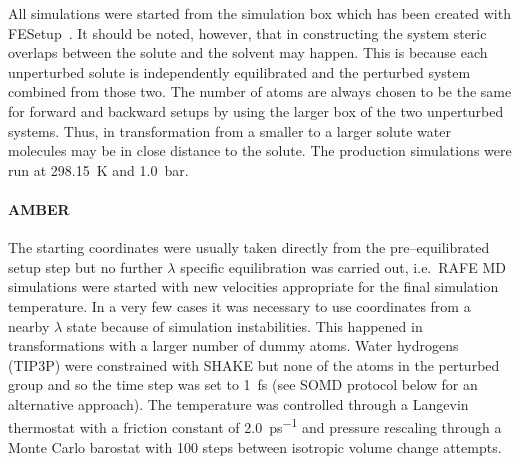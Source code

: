 \documentclass[journal=jctcce,manuscript=article]{achemso}
\begin{document}
All simulations were started from the simulation box which has been 
created with FESetup~\cite{loeffler_fesetup:_2015}.  It should be noted, 
however, that in constructing the system steric overlaps between the solute and 
the solvent may happen.  This is because each unperturbed solute is 
independently equilibrated and the perturbed system combined from those two.  
The number of atoms are always chosen to be the same for forward and backward 
setups by using the larger box of the two unperturbed systems.  Thus, in 
transformation from a smaller to a larger solute water molecules may be in 
close distance to the solute.  The production simulations were run at 
\SI{298.15}{K} and \SI{1.0}{bar}.

\paragraph{AMBER} The starting coordinates were usually taken directly from the
pre--equilibrated setup step but no further $\lambda$ specific equilibration 
was carried out, i.e.\ RAFE MD simulations were started with new velocities appropriate for the 
final simulation temperature.  In a very few cases it was necessary to use 
coordinates from a nearby $\lambda$ state because of simulation instabilities.  
This happened in transformations with a larger number of dummy atoms.  Water 
hydrogens (TIP3P) were constrained with SHAKE but none of the atoms in the 
perturbed group and so the time step was set to \SI{1}{fs} (see SOMD protocol 
below for an alternative approach).  The temperature was controlled through a 
Langevin thermostat with a friction constant of \SI{2.0}{ps^{-1}} and pressure 
rescaling through a Monte Carlo barostat with 100 steps between isotropic 
volume change attempts.
\end{document}
